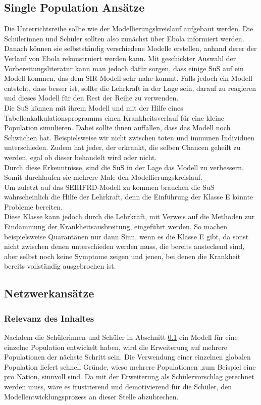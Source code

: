 \subsection{Single Population Ansätze}\label{ssec:did:spa}
\ellen
Die Unterrichtsreihe sollte wie der Modellierungskreislauf aufgebaut werden. Die Schülerinnen und Schüler sollten also zunächst über Ebola informiert werden. Danach können sie selbstständig verschiedene Modelle erstellen, anhand derer der Verlauf von Ebola rekonstruiert werden kann. Mit geschickter Auswahl der Vorbereitungsliteratur kann man jedoch dafür sorgen, dass einige SuS auf ein Modell kommen, das dem SIR-Modell sehr nahe kommt. Falls jedoch ein Modell entsteht, dass besser ist, sollte die Lehrkraft in der Lage sein, darauf zu reagieren und dieses Modell für den Rest der Reihe zu verwenden.\\
Die SuS können mit ihrem Modell und mit der Hilfe eines Tabellenkalkulationsprogramms einen Krankheitsverlauf für eine kleine Population simulieren. Dabei sollte ihnen auffallen, dass das Modell noch Schwächen hat. Beispielsweise wir nicht zwischen toten und immunen Individuen unterschieden. Zudem hat jeder, der erkrankt, die selben Chancen geheilt zu werden, egal ob dieser behandelt wird oder nicht.\\
 Durch diese Erkenntnisse, sind die SuS in der Lage das Modell zu verbessern. Somit durchlaufen sie mehrere Male den Modellierungskreislauf.\\
 Um zuletzt auf das SEIHFRD-Modell zu kommen brauchen die SuS wahrscheinlich die Hilfe der Lehrkraft, denn die Einführung der Klasse \glqq E\grqq{} könnte Probleme bereiten.\\
 Diese Klasse kann jedoch durch die Lehrkraft, mit Verweis auf die Methoden zur Eindämmung der Krankheitsausbreitung, eingeführt werden. So machen beispielsweise Quarantänen nur dann Sinn, wenn es die Klasse \glqq E\grqq{} gibt, da sonst nicht zwischen denen unterschieden werden muss, die bereits ansteckend sind, aber selbst noch keine Symptome zeigen und jenen, bei denen die Krankheit bereits vollständig ausgebrochen ist.  
\subsection{Netzwerkansätze}\steffen
\subsubsection*{Relevanz des Inhaltes}
Nachdem die Schülerinnen und Schüler in Abschnitt \ref{ssec:did:spa} ein Modell für eine einzelne Population entwickelt haben, wird die Erweiterung auf mehrere Populationen der nächste Schritt sein. Die Verwendung einer einzelnen globalen Population liefert schnell Gründe, wieso mehrere Populationen ,zum Beispiel eine pro Nation, sinnvoll sind. Da mit der Erweiterung als Schülervorschlag gerechnet werden muss, wäre es frustrierend und demotivierend für die Schüler, den Modellentwicklungsprozess an dieser Stelle abzubrechen.

